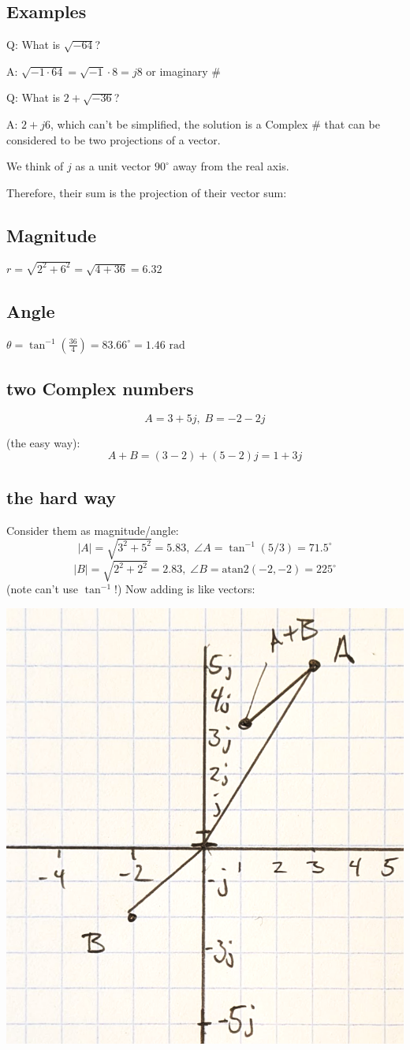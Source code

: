\subsection{Examples}

Q: What is $\sqrt{-64}$?

A: $\sqrt{-1 \cdot 64} = \sqrt{-1} \cdot 8 = j8$ or imaginary \#

Q: What is $2 + \sqrt{-36}$?


A: $2 + j6$, which can't be simplified, the solution is
a Complex \# that can be considered to
be two projections of a  vector.

We think of $j$ as a unit vector $90^\circ$ away from the real axis.


Therefore, their sum is the projection of their vector
sum:
\subsection{Magnitude}
$r = \sqrt{2^2 + 6^2} = \sqrt{4 + 36} = 6.32$
\subsection{Angle}
$\theta = \tan^{-1}\left(\frac{36}{4}\right) = 83.66^\circ = 1.46 \text{ rad}$

\subsection{two Complex numbers}

\[
A = 3+5j,\; B = -2-2j
\]

(the easy way):
\[
A+B = (3-2) + (5-2)j = 1+3j
\]

\subsection{the hard way }
Consider them as magnitude/angle:
\[
|A| = \sqrt{3^2+5^2} = 5.83,\; \angle{A} = \tan^{-1}(5/3) = 71.5^\circ
\]
\[
|B| = \sqrt{2^2+2^2} = 2.83,\; \angle{B} = \mathrm{atan2}(-2,-2) = 225^\circ
\]
(note can't use $\tan^{-1}$!)
Now adding is like vectors:


\includegraphics[width=.5\textwidth]{figsChapt01/AA65506.png}








